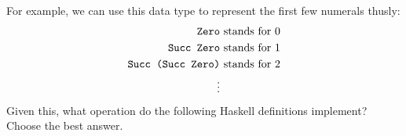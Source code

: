\documentclass[12pt]{article}
\begin{document}
For example, we can use this data type to represent the first few numerals
thusly:
\begin{align*}
\text{\tt Zero} &\text{ stands for } 0 \\
\text{\tt Succ Zero} &\text{ stands for } 1 \\
\text{\tt Succ (Succ Zero)} &\text{ stands for }  2 \\
\vdots
\end{align*}
Given this, what operation do the following Haskell definitions implement?
Choose the best answer.
\end{document}
